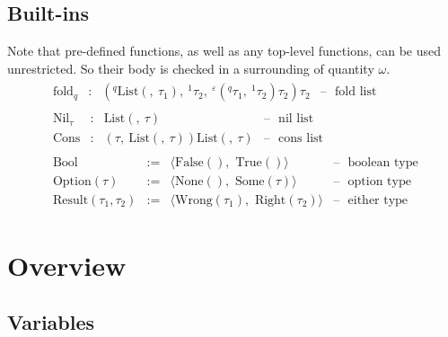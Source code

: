 \subsection{Built-ins}

Note that pre-defined functions, as well as any top-level functions, can
be used unrestricted. So their body is checked in a surrounding of
quantity \(\omega\). \[\begin{array}{r}
\begin{array}{llll}
\text{ fold}_{q} & : & {({{}^{q}{\text{List}({,\ }\tau_{1})}}{,\ }{{}^{1}\tau_{2}}{,\ }{{}^{\varepsilon}{({{}^{q}\tau_{1}}{,\ }{{}^{1}\tau_{2}})\tau_{2}}})\tau_{2}} & \text{– }\text{ fold list}
\end{array} \\
\begin{array}{llll}
\text{ Nil}_{\tau} & : & {\text{List}({,\ }\tau)} & \text{– }\text{ nil list} \\
\text{ Cons} & : & {(\tau{,\ }{\text{List}({,\ }\tau)}){\text{List}({,\ }\tau)}} & \text{– }\text{ cons list}
\end{array} \\
\begin{array}{llll}
\text{ Bool} & \text{:=} & {\langle\text{False}(),\text{ True}()\rangle} & \text{– }\text{ boolean type} \\
\text{ Option}(\tau) & \text{:=} & {\langle\text{None}(),\text{ Some}(\tau)\rangle} & \text{– }\text{ option type} \\
\text{ Result}\left( \tau_{1},\tau_{2} \right) & \text{:=} & {\langle\text{Wrong}\left( \tau_{1} \right),\text{ Right}\left( \tau_{2} \right)\rangle} & \text{– }\text{ either type}
\end{array}
\end{array}\]

\section{Overview}

\subsection{Variables}

